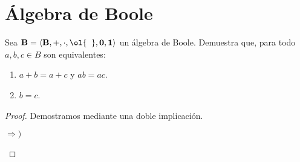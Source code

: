 \section{Álgebra de Boole}

\begin{ejercicio}
    Sea $\bf{B}=\langle B,+,\cdot,\ol{\phantom{a}}, 0,1\rangle$ un álgebra de Boole. Demuestra que,
    para todo $a,b,c\in B$ son equivalentes:
    \begin{enumerate}
        \item $a+b=a+c$ y $ab=ac$.
        \item $b=c$.
    \end{enumerate}
    \begin{proof}
        Demostramos mediante una doble implicación.
        \begin{description}
            \item[$\Longrightarrow)$]
            

\end{description}
\end{proof}
\end{ejercicio}
